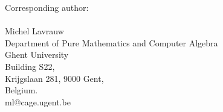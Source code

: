 \documentclass[12pt]{amsart}
\begin{document}
\vspace{1 cm}

Corresponding author:\\
\\
Michel Lavrauw\\
Department of Pure Mathematics and Computer Algebra\\
Ghent University\\
Building S22,\\
Krijgslaan 281, 9000 Gent,\\
Belgium.\\
ml@cage.ugent.be\\
\end{document}
